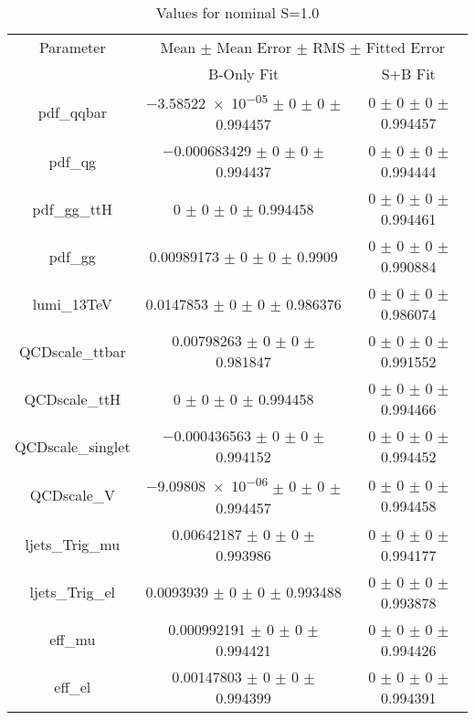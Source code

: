\begin{table}
\centering
\caption{Values for nominal S=1.0}
\begin{tabular}{ccc}
\toprule
Parameter 	& \multicolumn{2}{c}{Mean $\pm$ Mean Error $\pm$ RMS $\pm$ Fitted Error}\\
 	& B-Only Fit & S+B Fit\\
\midrule
pdf\_qqbar 	& \num{-3.58522e-05} $\pm$ \num{0} $\pm$ \num{0} $\pm$ \num{0.994457} 	& \num{0} $\pm$ \num{0} $\pm$ \num{0} $\pm$ \num{0.994457}\\
pdf\_qg 	& \num{-0.000683429} $\pm$ \num{0} $\pm$ \num{0} $\pm$ \num{0.994437} 	& \num{0} $\pm$ \num{0} $\pm$ \num{0} $\pm$ \num{0.994444}\\
pdf\_gg\_ttH 	& \num{0} $\pm$ \num{0} $\pm$ \num{0} $\pm$ \num{0.994458} 	& \num{0} $\pm$ \num{0} $\pm$ \num{0} $\pm$ \num{0.994461}\\
pdf\_gg 	& \num{0.00989173} $\pm$ \num{0} $\pm$ \num{0} $\pm$ \num{0.9909} 	& \num{0} $\pm$ \num{0} $\pm$ \num{0} $\pm$ \num{0.990884}\\
lumi\_13TeV 	& \num{0.0147853} $\pm$ \num{0} $\pm$ \num{0} $\pm$ \num{0.986376} 	& \num{0} $\pm$ \num{0} $\pm$ \num{0} $\pm$ \num{0.986074}\\
QCDscale\_ttbar 	& \num{0.00798263} $\pm$ \num{0} $\pm$ \num{0} $\pm$ \num{0.981847} 	& \num{0} $\pm$ \num{0} $\pm$ \num{0} $\pm$ \num{0.991552}\\
QCDscale\_ttH 	& \num{0} $\pm$ \num{0} $\pm$ \num{0} $\pm$ \num{0.994458} 	& \num{0} $\pm$ \num{0} $\pm$ \num{0} $\pm$ \num{0.994466}\\
QCDscale\_singlet 	& \num{-0.000436563} $\pm$ \num{0} $\pm$ \num{0} $\pm$ \num{0.994152} 	& \num{0} $\pm$ \num{0} $\pm$ \num{0} $\pm$ \num{0.994452}\\
QCDscale\_V 	& \num{-9.09808e-06} $\pm$ \num{0} $\pm$ \num{0} $\pm$ \num{0.994457} 	& \num{0} $\pm$ \num{0} $\pm$ \num{0} $\pm$ \num{0.994458}\\
ljets\_Trig\_mu 	& \num{0.00642187} $\pm$ \num{0} $\pm$ \num{0} $\pm$ \num{0.993986} 	& \num{0} $\pm$ \num{0} $\pm$ \num{0} $\pm$ \num{0.994177}\\
ljets\_Trig\_el 	& \num{0.0093939} $\pm$ \num{0} $\pm$ \num{0} $\pm$ \num{0.993488} 	& \num{0} $\pm$ \num{0} $\pm$ \num{0} $\pm$ \num{0.993878}\\
eff\_mu 	& \num{0.000992191} $\pm$ \num{0} $\pm$ \num{0} $\pm$ \num{0.994421} 	& \num{0} $\pm$ \num{0} $\pm$ \num{0} $\pm$ \num{0.994426}\\
eff\_el 	& \num{0.00147803} $\pm$ \num{0} $\pm$ \num{0} $\pm$ \num{0.994399} 	& \num{0} $\pm$ \num{0} $\pm$ \num{0} $\pm$ \num{0.994391}\\

\end{tabular}
\end{table}
